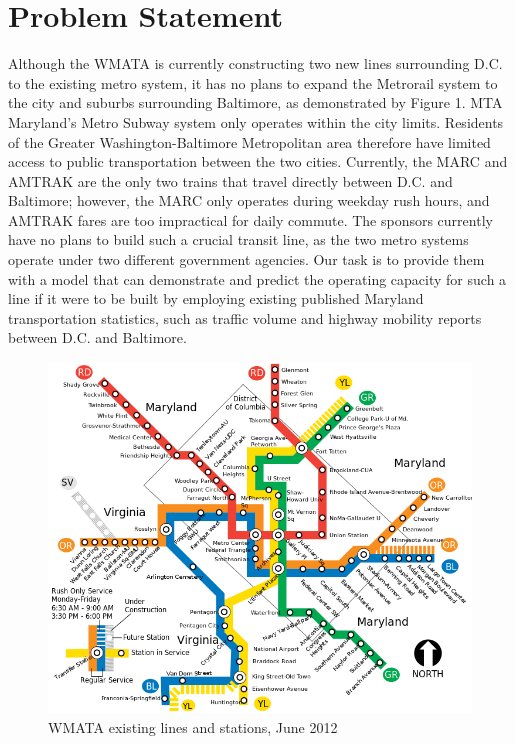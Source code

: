 \documentclass[12pt,letterpaper]{article}
\theoremstyle{definition}
\begin{document}
\section{Problem Statement}
Although the WMATA is currently constructing two new lines surrounding D.C. to the existing metro system, it has no plans to expand the Metrorail system to the city and suburbs surrounding Baltimore, as demonstrated by Figure 1. MTA Maryland's Metro Subway system only operates within the city limits. Residents of the Greater Washington-Baltimore Metropolitan area therefore have limited access to public transportation between the two cities. Currently, the MARC and AMTRAK are the only two trains that travel directly between D.C. and Baltimore; however, the MARC only operates during weekday rush hours, and AMTRAK fares are too impractical for daily commute. 
The sponsors currently have no plans to build such a crucial transit line, as the two metro systems operate under two different government agencies. Our task is to provide them with a model that can demonstrate and predict the operating capacity for such a line if it were to be built by employing existing published Maryland transportation statistics, such as traffic volume and highway mobility reports between D.C. and Baltimore.
\begin{figure}[h]
    \begin{center}
        \includegraphics[width=\textwidth]{WMATA_system_map.png}
    \end{center}
    \caption{WMATA existing lines and stations, June 2012}
\end{figure}
\end{document}
